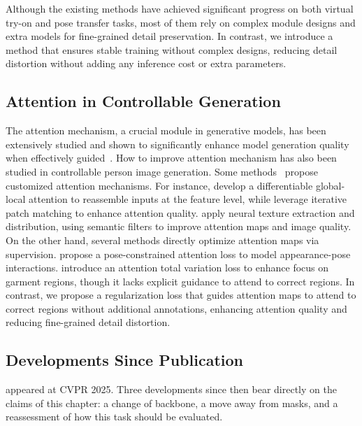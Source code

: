 Although the existing methods have achieved significant progress on both virtual try-on and pose transfer tasks, most of them rely on complex module designs and extra models for fine-grained detail preservation.
In contrast, we introduce a method that ensures stable training without complex designs, reducing detail distortion without adding any inference cost or extra parameters.


\subsection{Attention in Controllable Generation}

The attention mechanism, a crucial module in generative models, has been extensively studied and shown to significantly enhance model generation quality when effectively guided~\citep{liu2024faster, xie2023boxdiff, phung2024grounded, guo2024focus, chefer2023attend, cao2023masactrl, xiao2024fastcomposer, hertzprompt}.
How to improve attention mechanism has also been studied in controllable person image generation.
Some methods~\citep{ren2020deep, zhou2021cocosnet, ren2022neural, tang2020xinggan} propose customized attention mechanisms.
For instance, \citet{ren2020deep} develop a differentiable global-local attention to reassemble inputs at the feature level, while \citet{zhou2021cocosnet} leverage iterative patch matching to enhance attention quality.
\citet{ren2022neural} apply neural texture extraction and distribution, using semantic filters to improve attention maps and image quality.
On the other hand, several methods directly optimize attention maps via supervision.
\citet{han2023controllable} propose a pose-constrained attention loss to model appearance-pose interactions.
\citet{kim2024stableviton} introduce an attention total variation loss to enhance focus on garment regions, though it lacks explicit guidance to attend to correct regions.
In contrast, we propose a regularization loss that guides attention maps to attend to correct regions without additional annotations, enhancing attention quality and reducing fine-grained detail distortion.


\subsection{Developments Since Publication}
\label{leffa:sec:post_publication}
\leffa{} appeared at CVPR 2025. Three developments since then bear directly on the claims of this chapter: a change of backbone, a move away from masks, and a reassessment of how this task should be evaluated.

